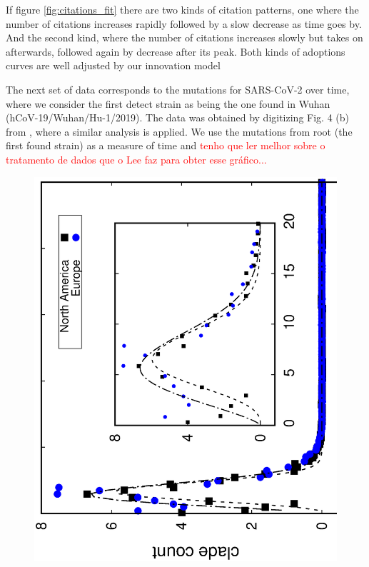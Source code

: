 If figure \ref{fig:citations_fit} there are two kinds of citation patterns, one where the number of citations increases rapidly followed by a slow decrease as time goes by. And the second kind, where the number of citations increases slowly but takes on afterwards, followed again by decrease after its peak. Both kinds of adoptions curves are well adjusted by our innovation model

The next set of data corresponds to the mutations for SARS-CoV-2 over time, where we consider the first detect strain as being the one found in Wuhan (hCoV-19/Wuhan/Hu-1/2019). The data was obtained by digitizing Fig. 4 (b) from \cite{Lee2022}, where a similar analysis is applied.
We use the mutations from root (the first found strain) as a measure of time and \textcolor{red}{tenho que ler melhor sobre o tratamento de dados que o Lee faz para obter esse gráfico...}

\begin{figure}[H]
    \centering\includegraphics[scale=0.35, angle=270]{figs/cladecount.eps}
    \caption{}
    \label{fig:}
\end{figure}

